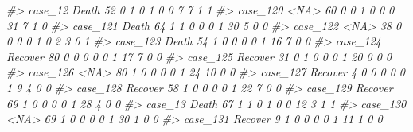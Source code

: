\documentclass[]{book}
\newenvironment{Shaded}{\begin{snugshade}}{\end{snugshade}}
\newcommand{\CommentTok}[1]{\textcolor[rgb]{0.56,0.35,0.01}{\textit{#1}}}
\begin{document}
\begin{Shaded}
\begin{Highlighting}[]
\CommentTok{#> case_12    Death  52        0        1                0                 1                 0              0                     7                      7           1             1}
\CommentTok{#> case_120    <NA>  60        0        0                1                 0                 0              0                    31                      7           1             0}
\CommentTok{#> case_121   Death  64        1        1                0                 0                 0              1                    30                      5           0             0}
\CommentTok{#> case_122    <NA>  38        0        0                0                 0                 1              0                     2                      3           0             1}
\CommentTok{#> case_123   Death  54        1        0                0                 0                 0              1                    16                      7           0             0}
\CommentTok{#> case_124 Recover  80        0        0                0                 0                 0              1                    17                      7           0             0}
\CommentTok{#> case_125 Recover  31        0        1                0                 0                 0              1                    20                      0           0             0}
\CommentTok{#> case_126    <NA>  80        1        0                0                 0                 0              1                    24                     10           0             0}
\CommentTok{#> case_127 Recover   4        0        0                0                 0                 0              1                     9                      4           0             0}
\CommentTok{#> case_128 Recover  58        1        0                0                 0                 0              1                    22                      7           0             0}
\CommentTok{#> case_129 Recover  69        1        0                0                 0                 0              1                    28                      4           0             0}
\CommentTok{#> case_13    Death  67        1        1                0                 1                 0              0                    12                      3           1             1}
\CommentTok{#> case_130    <NA>  69        1        0                0                 0                 0              1                    30                      1           0             0}
\CommentTok{#> case_131 Recover   9        1        0                0                 0                 0              1                    11                      1           0             0}

\end{Highlighting}
\end{Shaded}
\end{document}
